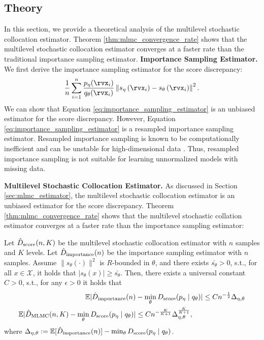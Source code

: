 \subsection{Theory}
\label{sec:theory}
In this section, we provide a theoretical analysis of the multilevel stochastic collocation estimator. Theorem \ref{thm:mlmc_convergence_rate} shows that the multilevel stochastic collocation estimator converges at a faster rate than the traditional importance sampling estimator.
\textbf{Importance Sampling Estimator.} We first derive the importance sampling estimator for the score discrepancy:
\begin{align}
	\frac{1}{n} \sum_{i=1}^{n} \frac{p_{\eta}(\rvx_{i})}{q_{\theta}(\rvx_{i})}  \left\| s_{\eta} \left( \rvx_{i} \right) - s_{\theta} \left( \rvx_{i} \right) \right\|^{2}. \label{eq:importance_sampling_estimator}
\end{align}
We can show that Equation \eqref{eq:importance_sampling_estimator} is an unbiased estimator for the score discrepancy. However, Equation \eqref{eq:importance_sampling_estimator} is a resampled importance sampling estimator. Resampled importance sampling is known to be computationally inefficient and can be unstable for high-dimensional data \citep{Wainwright2019}. Thus, resampled importance sampling is not suitable for learning unnormalized models with missing data.

\textbf{Multilevel Stochastic Collocation Estimator.} As discussed in Section \ref{sec:mlmc_estimator}, the multilevel stochastic collocation estimator is an unbiased estimator for the score discrepancy. Theorem \ref{thm:mlmc_convergence_rate} shows that the multilevel stochastic collation estimator converges at a faster rate than the importance sampling estimator:
\begin{theorem}%
	\label{thm:mlmc_convergence_rate}
	Let $\hat{D}_{\text{\rm{score}}}(n, K)$ be the multilevel stochastic collocation estimator with $n$ samples and $K$ levels. Let $\hat{D}_{\text{\rm{importance}}}(n)$ be the importance sampling estimator with $n$ samples. Assume $\| s_{\theta}(\cdot)\|^{2}$ is $R$-bounded in $\theta$, and there exists $\bar{s_{\theta}} > 0$, s.t., for all $x \in \mathcal{X}$, it holds that $|s_{\theta}(x)|\geq \bar{s_{\theta}}$. Then, there exists a universal constant $C>0$, s.t., for any $\epsilon > 0$ it holds that
	\begin{align*}
		\mathbb{E}|\hat{D}_{\text{\rm{importance}}}(n) &-\min_{\theta} D_{\text{\rm{score}}}(p_{\eta} \mid q_{\theta})| \leq C n^{-\frac{1}{2}} \Delta_{\eta,\theta} \\
		\mathbb{E}|\hat{D}_{\text{\rm{MLMC}}}(n,K) - \min_{\theta} D_{\text{\rm{score}}}(p_{\eta} \mid q_{\theta})| &\leq C n^{-\frac{K}{K+1}} \Delta_{\eta,\theta}^{\frac{K}{K+1}},
	\end{align*}
	where $\Delta_{\eta,\theta}:= \mathbb{E}[\hat{D}_{\text{\rm{importance}}}(n)] - \min_{\theta} D_{\text{\rm{score}}}(p_{\eta} \mid q_{\theta})$. 
\end{theorem}


